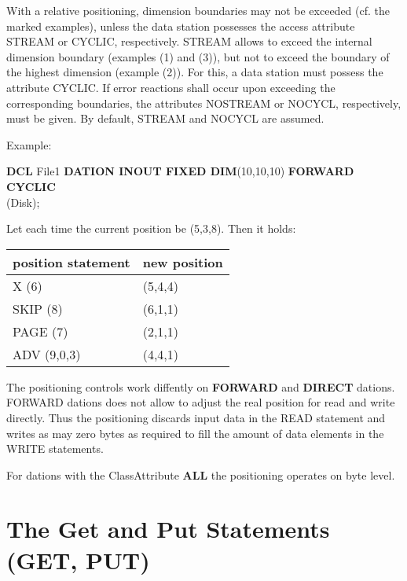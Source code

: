 With a relative positioning, dimension boundaries may not be exceeded
(cf. the marked examples), unless the data station possesses the access
attribute STREAM or CYCLIC, respectively. STREAM allows to exceed the
internal dimension boundary (examples (1) and (3)), but not to exceed
the boundary of the highest dimension (example (2)). For this, a data
station must possess the attribute CYCLIC. If error reactions shall
occur upon exceeding the corresponding boundaries, the attributes
NOSTREAM or NOCYCL, respectively, must be given. By default, STREAM and
NOCYCL are assumed.

Example:

{\bf DCL} File1 {\bf DATION INOUT FIXED DIM}(10,10,10) {\bf FORWARD CYCLIC}\\
(Disk);

Let each time the current position be (5,3,8). Then it holds:

\begin{tabular}{l@{\x}l}
position statement   & new position \\ \hline
X (6)                & (5,4,4)      \\
SKIP (8)             & (6,1,1)      \\
PAGE (7)             & (2,1,1)      \\
ADV (9,0,3)          & (4,4,1)
\end{tabular}

The positioning controls work diffently on {\bf FORWARD} and {\bf DIRECT}
dations. FORWARD dations does not allow to adjust the real position for read
and write directly. 
Thus the positioning discards input data in the READ statement and 
writes as may zero bytes as required to fill the amount of data elements
in the WRITE statements.

For dations with the ClassAttribute {\bf ALL}
the positioning operates on byte level.

\section{The Get and Put Statements (GET, PUT)}    %
\label{sec_get_put}

